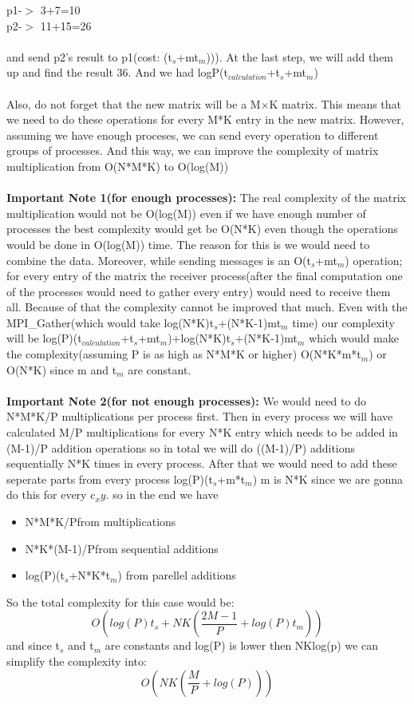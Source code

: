 p1-$>$ 3+7=10\\   
p2-$>$ 11+15=26\\
\\
and send p2's result to p1(cost: (t$_s$+mt$_m$))).
At the last step, we will add them up and find the result 36. And we had logP(t$_{calculation}$+t$_s$+mt$_m$)\\
\\
Also, do not forget that the new matrix will be a M$\times$K matrix. This means that we need to do these operations for every M*K entry in the new matrix. However, assuming we have enough proceses, we can send every operation to different groups of processes. And this way, we can improve the complexity of matrix multiplication from O(N*M*K) to O(log(M))\\
\\
\textbf{Important Note 1(for enough processes):} The real complexity of the matrix multiplication would not be O(log(M)) even if we have enough number of processes the best complexity would get be O(N*K) even though the operations would be done in O(log(M)) time. The reason for this is we would need to combine the data. Moreover, while sending messages is an O(t$_s$+mt$_m$) operation; for every entry of the matrix the receiver process(after the final computation one of the processes would need to gather every entry) would need to receive them all. Because of that the complexity cannot be improved that much. Even with the MPI\_Gather(which would take log(N*K)t$_s$+(N*K-1)mt$_m$ time) our complexity will be log(P)(t$_{calculation}$+t$_s$+mt$_m$)+log(N*K)t$_s$+(N*K-1)mt$_m$ which would make the complexity(assuming P is as high as N*M*K or higher) O(N*K*m*t$_m$) or O(N*K) since m and t$_m$ are constant.\\
\\
\textbf{Important Note 2(for not enough processes):} We would need to do N*M*K/P multiplications per process first. Then in every process we will have calculated M/P multiplications for every N*K entry which needs to be added in (M-1)/P addition operations so in total we will do ((M-1)/P) additions sequentially N*K times in every process. After that we would need to add these seperate parts from every process log(P)(t$_s$+m*t$_m$) m is N*K since we are gonna do this for every c$_xy$.
so in the end we have
\begin{itemize}
	\item N*M*K/P\quad from multiplications
	\item N*K*(M-1)/P\quad from sequential additions
	\item log(P)(t$_s$+N*K*t$_m$) \quad from parellel additions
\end{itemize}
So the total complexity for this case would be:\\
\[O(log(P)t_s+NK(\dfrac{2M-1}{P}+log(P)t_m))\]
and since t$_s$ and t$_m$ are constants and log(P) is lower then NKlog(p) we can simplify the complexity into:
\[O(NK(\dfrac{M}{P}+log(P)))\]

 